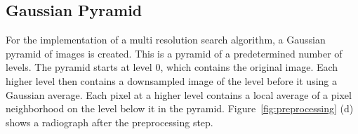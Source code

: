 \documentclass[a4paper]{article}
\begin{document}
\subsection{Gaussian Pyramid}
\label{subsect:gaussian-pyramid}
For the implementation of a multi resolution search algorithm, a Gaussian pyramid of images is created.
This is a pyramid of a predetermined number of levels.
The pyramid starts at level 0, which contains the original image.
Each higher level then contains a downsampled image of the level before it using a Gaussian average.
Each pixel at a higher level contains a local average of a pixel neighborhood on the level below it in the pyramid.
Figure~\ref{fig:preprocessing} (d) shows a radiograph after the preprocessing step.
\begin{figure}[H]
    \centering
    \qquad
    \qquad

\end{figure}
\end{document}
